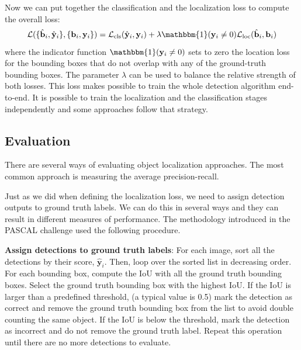Now we can put together the classification and the localization loss to compute the overall loss:
\begin{equation}
    \mathcal{L}( \{\hat{\mathbf{b}}_i, \hat{\mathbf{y}}_i\}, \{\mathbf{b}_i, \mathbf{y}_i\})
    =  \mathcal{L}_{\text{cls}}(\hat{\mathbf{y}}_i, \mathbf{y}_i) +
    \lambda \mathbbm{1} (\mathbf{y}_i \neq 0)
    \mathcal{L}_{\text{loc}}
    (\hat{\mathbf{b}}_i, \mathbf{b}_i)
\end{equation}
where the indicator function $\mathbbm{1} (\mathbf{y}_i \neq 0)$ sets to zero the location loss for the bounding boxes that do not overlap with any of the ground-truth bounding boxes. The parameter $\lambda$ can be used to balance the relative strength of both losses. This loss makes possible to train the whole detection algorithm end-to-end. It is possible to train the localization and the classification stages independently and some approaches follow that strategy.



\subsection{Evaluation}

There are several ways of evaluating object localization approaches. The most common approach is measuring the average precision-recall.

Just as we did when defining the localization loss, we need to assign detection outputs to ground truth labels. We can do this in several ways and they can result in different measures of performance. The methodology introduced in the PASCAL challenge used the following procedure.

    {\bf Assign detections to ground truth labels}: For each image, sort all the detections by their score, $\hat{\mathbf{y}}_i$. Then, loop over the sorted list in decreasing order. For each bounding box, compute the IoU with all the ground truth bounding boxes. Select the ground truth bounding box with the highest IoU. If the IoU is larger than a predefined threshold, (a typical value is 0.5) mark the detection as correct and remove the ground truth bounding box from the list to avoid double counting the same object. If the IoU is below the threshold, mark the detection as incorrect and do not remove the ground truth label. Repeat this operation until there are no more detections to evaluate.

